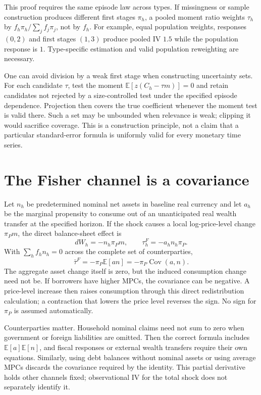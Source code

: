 \documentclass[11pt]{article}
\newcommand{\E}{\mathbb E}
\newcommand{\Cov}{\operatorname{Cov}}
\begin{document}
This proof requires the same episode law across types. If missingness or sample construction produces different first stages $\pi_h$, a pooled moment ratio weights $\tau_h$ by $f_h\pi_h/\sum_j f_j\pi_j$, not by $f_h$. For example, equal population weights, responses $(0,2)$ and first stages $(1,3)$ produce pooled IV $1.5$ while the population response is $1$. Type-specific estimation and valid population reweighting are necessary.

One can avoid division by a weak first stage when constructing uncertainty sets. For each candidate $\tau$, test the moment $\E[z(C_h-\tau m)]=0$ and retain candidates not rejected by a size-controlled test under the specified episode dependence. Projection then covers the true coefficient whenever the moment test is valid there. Such a set may be unbounded when relevance is weak; clipping it would sacrifice coverage. This is a construction principle, not a claim that a particular standard-error formula is uniformly valid for every monetary time series.

\section*{The Fisher channel is a covariance}
Let $n_h$ be predetermined nominal net assets in baseline real currency and let $a_h$ be the marginal propensity to consume out of an unanticipated real wealth transfer at the specified horizon. If the shock causes a local log-price-level change $\pi_Pm$, the direct balance-sheet effect is
\[
 dW_h=-n_h\pi_Pm,\qquad
 \tau_h^{F}=-a_hn_h\pi_P.
\]
With $\sum_h f_hn_h=0$ across the complete set of counterparties,
\[
 \bar\tau^F=-\pi_P\E[an]
 =-\pi_P\Cov(a,n).
\]
The aggregate asset change itself is zero, but the induced consumption change need not be. If borrowers have higher MPCs, the covariance can be negative. A price-level increase then raises consumption through this direct redistribution calculation; a contraction that lowers the price level reverses the sign. No sign for $\pi_P$ is assumed automatically.

Counterparties matter. Household nominal claims need not sum to zero when government or foreign liabilities are omitted. Then the correct formula includes $\E[a]\E[n]$, and fiscal responses or external wealth transfers require their own equations. Similarly, using debt balances without nominal assets or using average MPCs discards the covariance required by the identity. This partial derivative holds other channels fixed; observational IV for the total shock does not separately identify it.
\end{document}
